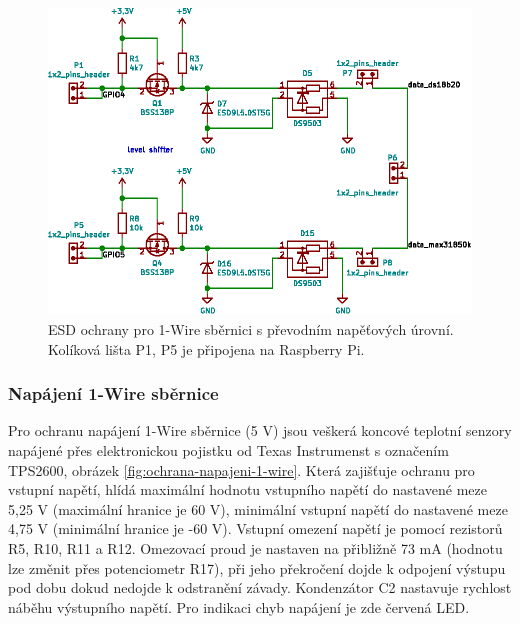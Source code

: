 \begin{figure}[H]
    \centering
    \includegraphics[width=\textwidth]{images/svg/kicad/ochrany-1-wire.eps}
    \caption[ESD ochrany pro 1-Wire sběrnici s~převodním napěťových úrovní]{ESD ochrany pro 1-Wire sběrnici s převodním napěťových úrovní. Kolíková lišta P1, P5 je připojena na Raspberry Pi.}
    \label{fig:ochrany-1-wire}
\end{figure}


\subsubsection{Napájení 1-Wire sběrnice}
\label{sec:napajeni-1-wire-sbernice}
Pro ochranu napájení 1-Wire sběrnice (5 V) jsou veškerá koncové teplotní senzory napájené přes elektronickou pojistku od Texas Instrumenst s označením TPS2600, obrázek \ref{fig:ochrana-napajeni-1-wire}. Která zajišťuje ochranu pro vstupní napětí, hlídá maximální hodnotu vstupního napětí do nastavené meze 5,25 V (maximální hranice je 60 V), minimální vstupní napětí do nastavené meze 4,75 V (minimální hranice je -60 V). Vstupní omezení napětí je pomocí rezistorů R5, R10, R11 a R12. Omezovací proud je nastaven na přibližně 73 mA (hodnotu lze změnit přes potenciometr R17), při jeho překročení dojde k odpojení výstupu pod dobu dokud nedojde k odstranění závady. Kondenzátor C2 nastavuje rychlost náběhu výstupního napětí. Pro indikaci chyb napájení je zde červená LED.

